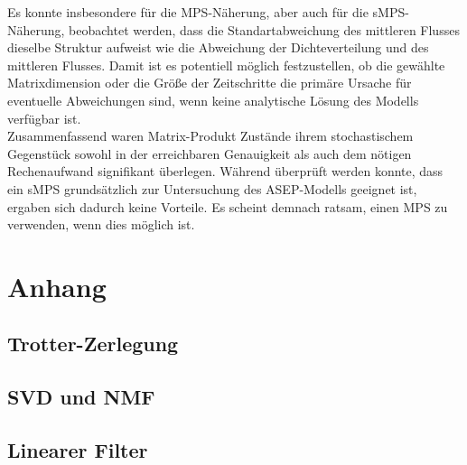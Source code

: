 \documentclass[10pt,a4paper]{report}
\begin{document}
Es konnte insbesondere für die MPS-Näherung, aber auch für die sMPS-Näherung, beobachtet werden, dass die Standartabweichung des mittleren Flusses dieselbe Struktur aufweist wie die Abweichung der Dichteverteilung und des mittleren Flusses. Damit ist es potentiell möglich festzustellen, ob die gewählte Matrixdimension oder die Größe der Zeitschritte die primäre Ursache für eventuelle Abweichungen sind, wenn keine analytische Lösung des Modells verfügbar ist.\\

Zusammenfassend waren Matrix-Produkt Zustände ihrem stochastischem Gegenstück sowohl in der erreichbaren Genauigkeit als auch dem nötigen Rechenaufwand signifikant überlegen. Während überprüft werden konnte, dass ein sMPS grundsätzlich zur Untersuchung des ASEP-Modells geeignet ist, ergaben sich dadurch keine Vorteile. Es scheint demnach ratsam, einen MPS zu verwenden, wenn dies möglich ist.


\chapter{Anhang}
\section{Trotter-Zerlegung}\label{trotter}

\section{SVD und NMF}
\section{Linearer Filter}\label{gaus_filter}


 

\end{document}
